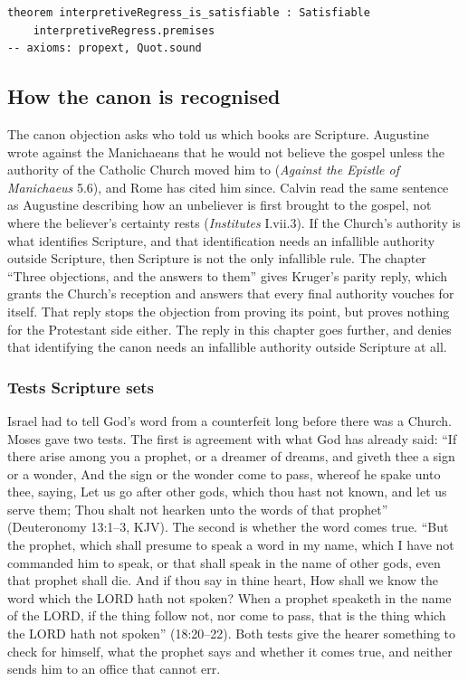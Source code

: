 \documentclass[11pt]{article}
\begin{document}
{\small\begin{verbatim}
theorem interpretiveRegress_is_satisfiable : Satisfiable
    interpretiveRegress.premises
-- axioms: propext, Quot.sound
\end{verbatim}}
\subsection*{How the canon is recognised}
The canon objection asks who told us which books are Scripture. Augustine wrote against the Manichaeans that he would not believe the gospel unless the authority of the Catholic Church moved him to (\emph{Against the Epistle of Manichaeus} 5.6), and Rome has cited him since. Calvin read the same sentence as Augustine describing how an unbeliever is first brought to the gospel, not where the believer’s certainty rests (\emph{Institutes} I.vii.3). If the Church’s authority is what identifies Scripture, and that identification needs an infallible authority outside Scripture, then Scripture is not the only infallible rule. The chapter “Three objections, and the answers to them” gives Kruger’s parity reply, which grants the Church’s reception and answers that every final authority vouches for itself. That reply stops the objection from proving its point, but proves nothing for the Protestant side either. The reply in this chapter goes further, and denies that identifying the canon needs an infallible authority outside Scripture at all.

\subsubsection*{Tests Scripture sets}
Israel had to tell God’s word from a counterfeit long before there was a Church. Moses gave two tests. The first is agreement with what God has already said: “If there arise among you a prophet, or a dreamer of dreams, and giveth thee a sign or a wonder, And the sign or the wonder come to pass, whereof he spake unto thee, saying, Let us go after other gods, which thou hast not known, and let us serve them; Thou shalt not hearken unto the words of that prophet” (Deuteronomy 13:1–3, KJV). The second is whether the word comes true. “But the prophet, which shall presume to speak a word in my name, which I have not commanded him to speak, or that shall speak in the name of other gods, even that prophet shall die. And if thou say in thine heart, How shall we know the word which the LORD hath not spoken? When a prophet speaketh in the name of the LORD, if the thing follow not, nor come to pass, that is the thing which the LORD hath not spoken” (18:20–22). Both tests give the hearer something to check for himself, what the prophet says and whether it comes true, and neither sends him to an office that cannot err.
\end{document}
